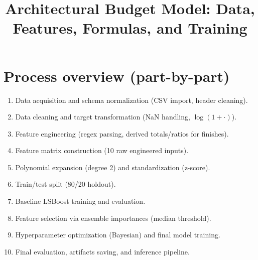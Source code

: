 \documentclass[11pt]{article}
\title{Architectural Budget Model: Data, Features, Formulas, and Training}
\author{}
\date{}
\begin{document}
\maketitle

\section*{Process overview (part-by-part)}
\begin{enumerate}[label=Part~\arabic*:, leftmargin=*]
  \item Data acquisition and schema normalization (CSV import, header cleaning).
  \item Data cleaning and target transformation (NaN handling, $\log(1+\cdot)$).
  \item Feature engineering (regex parsing, derived totals/ratios for finishes).
  \item Feature matrix construction (10 raw engineered inputs).
  \item Polynomial expansion (degree 2) and standardization (z-score).
  \item Train/test split (80/20 holdout).
  \item Baseline LSBoost training and evaluation.
  \item Feature selection via ensemble importances (median threshold).
  \item Hyperparameter optimization (Bayesian) and final model training.
  \item Final evaluation, artifacts saving, and inference pipeline.
\end{enumerate}
\end{document}

